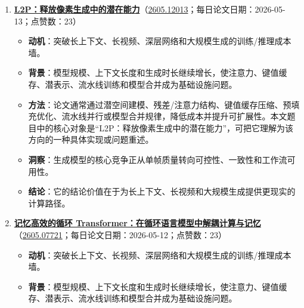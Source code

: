 \begin{enumerate}[leftmargin=1.5em]
\begin{itemize}[leftmargin=1.5em]
    \item \textbf{背景}：模型规模、上下文长度和生成时长继续增长，使注意力、键值缓存、潜表示、流水线训练和模型合并成为基础设施问题。
    \item \textbf{方法}：论文通常通过潜空间建模、残差/注意力结构、键值缓存压缩、预填充优化、流水线并行或模型合并规律，降低成本并提升可扩展性。本文题目中的核心对象是“超越最后一层：用于视觉词元化的多层表征融合”，可把它理解为该方向的一种具体实现或问题重述。
    \item \textbf{洞察}：生成模型的核心竞争正从单帧质量转向可控性、一致性和工作流可用性。
    \item \textbf{结论}：它的结论价值在于为长上下文、长视频和大规模生成提供更现实的计算路径。
  \end{itemize}
  \item \textbf{\href{https://huggingface.co/papers/2605.12013}{L2P：释放像素生成中的潜在能力}}（\href{https://arxiv.org/abs/2605.12013}{2605.12013}；每日论文日期：2026-05-13；点赞数：23）
  \begin{itemize}[leftmargin=1.5em]
    \item \textbf{动机}：突破长上下文、长视频、深层网络和大规模生成的训练/推理成本墙。
    \item \textbf{背景}：模型规模、上下文长度和生成时长继续增长，使注意力、键值缓存、潜表示、流水线训练和模型合并成为基础设施问题。
    \item \textbf{方法}：论文通常通过潜空间建模、残差/注意力结构、键值缓存压缩、预填充优化、流水线并行或模型合并规律，降低成本并提升可扩展性。本文题目中的核心对象是“L2P：释放像素生成中的潜在能力”，可把它理解为该方向的一种具体实现或问题重述。
    \item \textbf{洞察}：生成模型的核心竞争正从单帧质量转向可控性、一致性和工作流可用性。
    \item \textbf{结论}：它的结论价值在于为长上下文、长视频和大规模生成提供更现实的计算路径。
  \end{itemize}
  \item \textbf{\href{https://huggingface.co/papers/2605.07721}{记忆高效的循环 Transformer：在循环语言模型中解耦计算与记忆}}（\href{https://arxiv.org/abs/2605.07721}{2605.07721}；每日论文日期：2026-05-12；点赞数：23）
  \begin{itemize}[leftmargin=1.5em]
    \item \textbf{动机}：突破长上下文、长视频、深层网络和大规模生成的训练/推理成本墙。
    \item \textbf{背景}：模型规模、上下文长度和生成时长继续增长，使注意力、键值缓存、潜表示、流水线训练和模型合并成为基础设施问题。

\end{itemize}
\end{enumerate}
